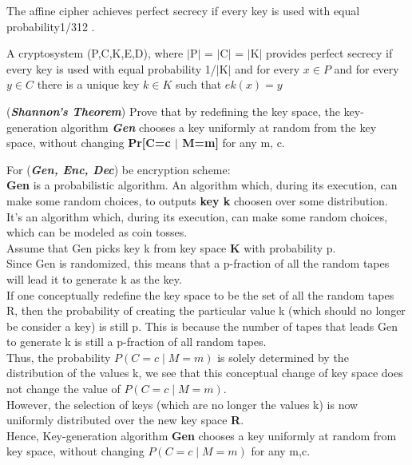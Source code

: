 \documentclass[11pt]{exam}
\begin{document}
\begin{questions}
\begin{solution}
    The affine cipher achieves perfect secrecy if every key is used with equal probability1/312 .\par
    A cryptosystem (P,C,K,E,D), where $\mid$P$\mid$ = $\mid$C$\mid$ = $\mid$K$\mid$ provides perfect secrecy if every key is used with equal probability 1/$\mid$K$\mid$  and for every $x \in P$ and for every $y \in  C$ there is a unique key $k \in K$ such that $ek(x)= y$
\end{solution}



\question[10] ({\bf \textit{Shannon's Theorem}}) 
Prove that by redefining the key space, the key-generation algorithm \textbf{\textit{Gen}} chooses a key uniformly at random from the key space, without changing \textbf{Pr[C=c $\mid$ M=m]} for any m, c.
\begin{solution}
    For ({\bf \textit{Gen, Enc, Dec}}) be encryption scheme:\\
    \textbf{Gen} is a probabilistic algorithm. An algorithm which, during its execution, can make some random choices, to outputs \textbf{key k} choosen over some distribution.\\
    It's an algorithm which, during its execution, can make some random choices, which can be modeled as coin tosses.\\
    Assume that Gen picks key k from key space \textbf{K} with probability p.\\
    Since Gen is randomized, this means that a p-fraction of all the random tapes will lead it to generate k as the key.\\
    If one conceptually redefine the key space to be the set of all the random tapes R, then the probability of creating the particular value k (which should no longer be consider a key) is still p. This is because the number of tapes that leads Gen to generate k is still a p-fraction of all random tapes.\\
    Thus, the probability $P(C=c\mid M=m)$ is solely determined by the distribution of the values k, we see that this conceptual change of key space does not change the value of $P(C=c\mid M=m)$.\\
    However, the selection of keys (which are no longer the values k) is now uniformly distributed over the new key space \textbf{R}.\\
    Hence, Key-generation algorithm \textbf{Gen} chooses a key uniformly at random from key space, without changing $P(C=c\mid M=m)$ for any m,c.\\
\end{solution}


\end{questions}
\end{document}
